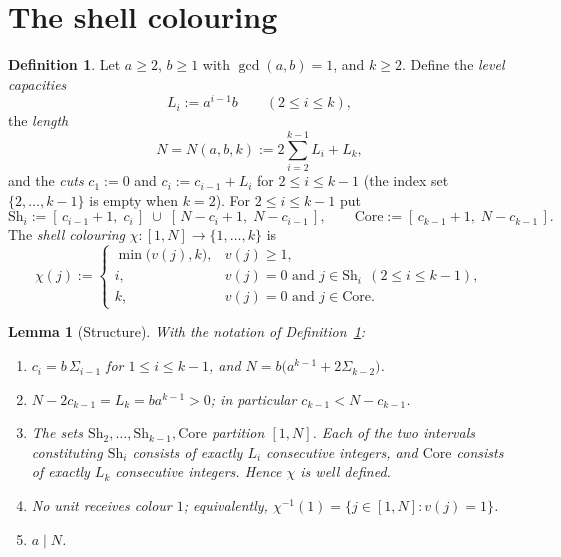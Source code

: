 \documentclass{amsart}
\newtheorem{lemma}[theorem]{Lemma}
\theoremstyle{definition}
\newtheorem{definition}[theorem]{Definition}
\newcommand{\Sh}{\mathrm{Sh}}
\newcommand{\Core}{\mathrm{Core}}
\begin{document}
\section{The shell colouring}\label{sec:shell}

\begin{definition}\label{def:shell}
Let $a\ge2$, $b\ge1$ with $\gcd(a,b)=1$, and $k\ge2$.  Define the
\emph{level capacities}
\[
  L_i:=a^{i-1}b\qquad(2\le i\le k),
\]
the \emph{length}
\[
  N=N(a,b,k):=2\sum_{i=2}^{k-1}L_i+L_k ,
\]
and the \emph{cuts} $c_1:=0$ and $c_i:=c_{i-1}+L_i$ for $2\le i\le k-1$ (the
index set $\{2,\dots,k-1\}$ is empty when $k=2$).  For $2\le i\le k-1$ put
\[
  \Sh_i:=[\,c_{i-1}+1,\;c_i\,]\;\cup\;[\,N-c_i+1,\;N-c_{i-1}\,],
  \qquad
  \Core:=[\,c_{k-1}+1,\;N-c_{k-1}\,].
\]
The \emph{shell colouring} $\chi\colon[1,N]\to\{1,\dots,k\}$ is
\[
  \chi(j):=
  \begin{cases}
    \min\bigl(v(j),k\bigr), & v(j)\ge1,\\[2pt]
    i, & v(j)=0 \text{ and } j\in \Sh_i \ \ (2\le i\le k-1),\\[2pt]
    k, & v(j)=0 \text{ and } j\in \Core .
  \end{cases}
\]
\end{definition}

\begin{lemma}[Structure]\label{lem:structure}
With the notation of Definition~\ref{def:shell}:
\begin{enumerate}
\item $c_i=b\,\Sigma_{i-1}$ for $1\le i\le k-1$, and
      $N=b\bigl(a^{k-1}+2\Sigma_{k-2}\bigr)$.
\item $N-2c_{k-1}=L_k=ba^{k-1}>0$; in particular $c_{k-1}<N-c_{k-1}$.
\item The sets $\Sh_2,\dots,\Sh_{k-1},\Core$ partition $[1,N]$.  Each of the
      two intervals constituting $\Sh_i$ consists of exactly $L_i$ consecutive
      integers, and $\Core$ consists of exactly $L_k$ consecutive integers.
      Hence $\chi$ is well defined.
\item No unit receives colour $1$; equivalently,
      $\chi^{-1}(1)=\{j\in[1,N]: v(j)=1\}$.
\item $a\mid N$.
\end{enumerate}
\end{lemma}
\end{document}
